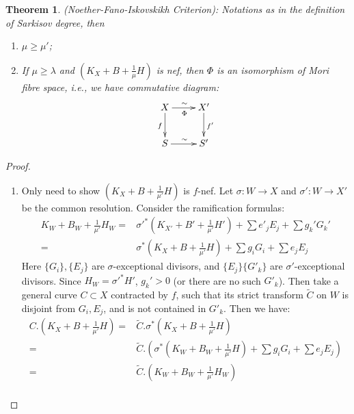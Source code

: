 \documentclass{article}
\newtheorem{thm}[defn]{Theorem}
\begin{document}
\begin{thm}\label{nfi}
  (Noether-Fano-Iskovskikh Criterion): Notations as in the definition of Sarkisov degree, then 
  \begin{enumerate}
    \item $ \mu\geqslant \mu' $;
    \item If $ \mu \geqslant \lambda $ and $ (K_X+B+\frac{1}{\mu} H) $ is nef, then $\Phi$ is an isomorphism of Mori fibre space, i.e., we have commutative diagram: 
      \[ \xymatrix{
          X\ar[r]^\sim_\Phi\ar[d]_f&X'\ar[d]^{f'}\\
      S\ar[r]^\sim& S' } \]
  \end{enumerate}
\end{thm}

\begin{proof}
  \begin{enumerate}
    \item Only need to show $ (K_X+B+\frac{1}{\mu'}H) $ is $ f $-nef.   Let $\sigma:W\to X$ and $\sigma':W\to X'$ be the common resolution. Consider the ramification formulas:
      \[
        \begin{aligned}  
          K_W+B_W+\frac{1}{\mu'}H_W=&\sigma'^*(K_{X'}+B'+\frac{1}{\mu'}H')+\sum e'_jE_j+ \sum g_k'G_k'\\
          =&\sigma^*(K_{X}+B+\frac{1}{\mu'}H)+\sum g_iG_i+\sum e_jE_j
        \end{aligned}
      \]
      Here $ \{G_i\}, \{E_j\} $ are $ \sigma $-exceptional divisors, and $ \{E_j\}\{G'_k\} $ are $ \sigma' $-exceptional divisors. Since $H_W=\sigma'^*H' $, $ g_k'>0 $ (or there are no such $ G'_k $). Then take a general curve $ C\subset X $ contracted by $ f $, such that its strict transform $ \tilde{C} $ on $ W $ is disjoint from $ G_i, E_j $, and is not contained in $ G'_k $. Then we have:
      \[
        \begin{aligned}
          C.\left(K_X+B+\frac{1}{\mu'}H\right)=&\tilde{C}.\sigma^*\left(K_X+B+\frac{1}{\mu'}H\right)
          \\=&\tilde{C}.\left(\sigma^*\left(K_W+B_{W}+\frac{1}{\mu'}H\right)+\sum g_iG_i+\sum e_jE_j\right)\\
          =&\tilde{C}.\left(K_W+B_W+\frac{1}{\mu'}H_W\right)\\

\end{aligned}\]
\end{enumerate}
\end{proof}
\end{document}
